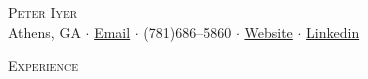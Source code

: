 \documentclass[a4paper]{article}
\newcommand{\lineunder} {
    \vspace*{-8pt} \\
    \hspace*{-18pt} \hrulefill \\
}
\newcommand{\header} [1] {
    {\hspace*{-18pt}\vspace*{6pt} \textsc{#1}}
    \vspace*{-6pt} \lineunder
}
\begin{document}
\vspace*{-40pt}

    

\vspace*{-10pt}
\begin{center}
	{\Huge \scshape {Peter Iyer}}\\
{\faMapMarker} Athens, GA $\cdot$ \href{mailto:ptryr.64@gmail.com}{{\faEnvelopeO} Email} $\cdot$ {\faPhone} (781)686--5860 $\cdot$ \href{https://ptr-64.github.io/}{{\faGlobe} Website} $\cdot$ \href{https://www.linkedin.com/in/peter-i-a024372b8/}{{\faLinkedinSquare} Linkedin}\\
\end{center}

\header{Experience}
\vspace{1mm}
\end{document}
